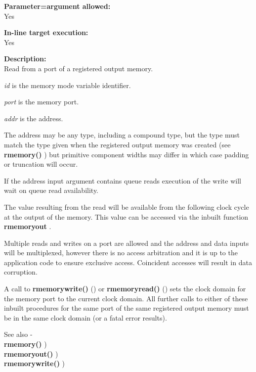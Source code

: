         {\bf Parameter=argument allowed:} \\
        Yes
        
        {\bf In-line target execution:} \\
        Yes
        
        {\bf Description:} \\
        Read from a port of a registered output memory.

        {\em id} is the memory mode variable identifier.
        
        {\em port} is the memory port.
        
        {\em addr} is the address.
        
        The address may be any type, including a compound type, but the type
        must match the type given when the registered output memory was created
        (see {\bf rmemory()} ) but primitive component
        widths may differ in which case padding or truncation will occur.

        If the address input argument contains queue reads execution of the write
        will wait on queue read availability.

        The value resulting from the read will be available from the following
        clock cycle at the output of the memory. This value can be accessed via
        the inbuilt function {\bf rmemoryout} .

        Multiple reads and writes on a port are allowed and the address and
        data inputs will be multiplexed, however there is no access arbitration
        and it is up to the application code to ensure exclusive access.
        Coincident accesses will result in data corruption.

        A call to {\bf rmemorywrite()} () or {\bf
        rmemoryread()} ()  sets the clock domain
        for the memory port to the current clock domain. All further calls to
        either of these inbuilt procedures for the same port of the same
        registered output memory must be in the same clock domain (or a fatal
        error results).
        
        See also - \\
        {\bf rmemory()} ) \\
        {\bf rmemoryout()} ) \\
        {\bf rmemorywrite()} ) \\


